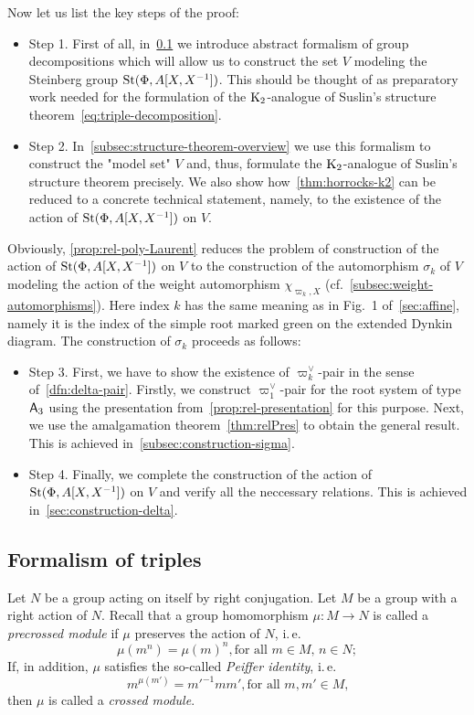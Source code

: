 Now let us list the key steps of the proof:
\begin{itemize}
    \item Step 1. First of all, in~\cref{subsec:triples} we introduce abstract formalism of group decompositions which will allow us to construct the set $V$ modeling the Steinberg group $\operatorname{St}(\Phi, A[X, X^{-1}])$.
                  This should be thought of as preparatory work needed for the formulation of the $\operatorname{K}_2$-analogue of Suslin's structure theorem~\eqref{eq:triple-decomposition}.
    \item Step 2. In~\cref{subsec:structure-theorem-overview} we use this formalism to construct the "model set" $V$ and, thus, formulate the $\operatorname{K}_2$-analogue of Suslin's structure theorem precisely.
                  We also show how~\cref{thm:horrocks-k2} can be reduced to a concrete technical statement, namely,
                  to the existence of the action of $\operatorname{St}(\Phi, A[X, X^{-1}])$ on $V$.
\end{itemize}
Obviously, \cref{prop:rel-poly-Laurent} reduces the problem of construction of the action of $\operatorname{St}(\Phi, A[X, X^{-1}])$ on $V$ to the construction of
 the automorphism $\sigma_k$ of $V$ modeling the action of the weight automorphism $\chi_{\varpi_k, X}$ (cf.~\cref{subsec:weight-automorphisms}).
Here index $k$ has the same meaning as in Fig.~1 of~\cref{sec:affine}, namely it is the index of the simple root marked green on the extended Dynkin diagram.
The construction of $\sigma_k$ proceeds as follows:
\begin{itemize}
    \item Step 3. First, we have to show the existence of $\varpi_k^\vee$-pair in the sense of~\cref{dfn:delta-pair}.
                  Firstly, we construct $\varpi_1^\vee$-pair for the root system of type $\mathsf{A}_3$ using the presentation from~\cref{prop:rel-presentation} for this purpose.
                  Next, we use the amalgamation theorem~\cref{thm:relPres} to obtain the general result.
                  This is achieved in~\cref{subsec:construction-sigma}.
    \item Step 4. Finally, we complete the construction of the action of $\operatorname{St}(\Phi, A[X, X^{-1}])$ on $V$ and verify all the neccessary relations.
                  This is achieved in~\cref{sec:construction-delta}.
\end{itemize}

\subsection{Formalism of triples}\label{subsec:triples}
Let $N$ be a group acting on itself by right conjugation.
Let $M$ be a group with a right action of $N$.
Recall that a group homomorphism $\mu\colon M \to N$ is called a \textit{precrossed module} if $\mu$ preserves the action of $N$, i.\,e.
\[\mu(m^n) = \mu(m)^n, \text{for all $m \in M$, $n\in N;$} \]
If, in addition, $\mu$ satisfies the so-called \textit{Peiffer identity}, i.\,e.
\[{m}^{\mu(m')} = {m'}^{-1} m m', \text{for all $m, m' \in M$,}\]
then $\mu$ is called a \textit{crossed module}.

